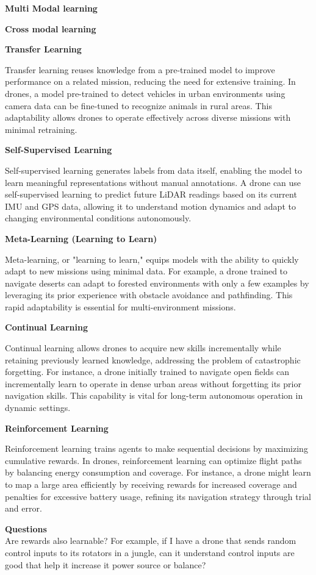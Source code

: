 \documentclass{book}
\providecommand{\ProjectDeepHeading}[2]{%
    \par\medskip\noindent\textbf{#2}\par\smallskip
}
\begin{document}
\ProjectDeepHeading{4}{Multi Modal learning}


\ProjectDeepHeading{4}{Cross modal learning}

\ProjectDeepHeading{4}{Transfer Learning}
Transfer learning reuses knowledge from a pre-trained model to improve performance on a related mission, reducing the need for extensive training. In drones, a model pre-trained to detect vehicles in urban environments using camera data can be fine-tuned to recognize animals in rural areas. This adaptability allows drones to operate effectively across diverse missions with minimal retraining.

\ProjectDeepHeading{4}{Self-Supervised Learning}
Self-supervised learning generates labels from data itself, enabling the model to learn meaningful representations without manual annotations. A drone can use self-supervised learning to predict future LiDAR readings based on its current IMU and GPS data, allowing it to understand motion dynamics and adapt to changing environmental conditions autonomously. 

\ProjectDeepHeading{4}{Meta-Learning (Learning to Learn)}
Meta-learning, or "learning to learn," equips models with the ability to quickly adapt to new missions using minimal data. For example, a drone trained to navigate deserts can adapt to forested environments with only a few examples by leveraging its prior experience with obstacle avoidance and pathfinding. This rapid adaptability is essential for multi-environment missions.

\ProjectDeepHeading{4}{Continual Learning}
Continual learning allows drones to acquire new skills incrementally while retaining previously learned knowledge, addressing the problem of catastrophic forgetting. For instance, a drone initially trained to navigate open fields can incrementally learn to operate in dense urban areas without forgetting its prior navigation skills. This capability is vital for long-term autonomous operation in dynamic settings. 

\ProjectDeepHeading{4}{Reinforcement Learning}
Reinforcement learning trains agents to make sequential decisions by maximizing cumulative rewards. In drones, reinforcement learning can optimize flight paths by balancing energy consumption and coverage. For instance, a drone might learn to map a large area efficiently by receiving rewards for increased coverage and penalties for excessive battery usage, refining its navigation strategy through trial and error. 

\textbf{Questions}
\\
Are rewards also learnable? For example, if I have a drone that sends random control inputs to its rotators in a jungle, can it understand control inputs are good that help it increase it power source or balance?
\end{document}
